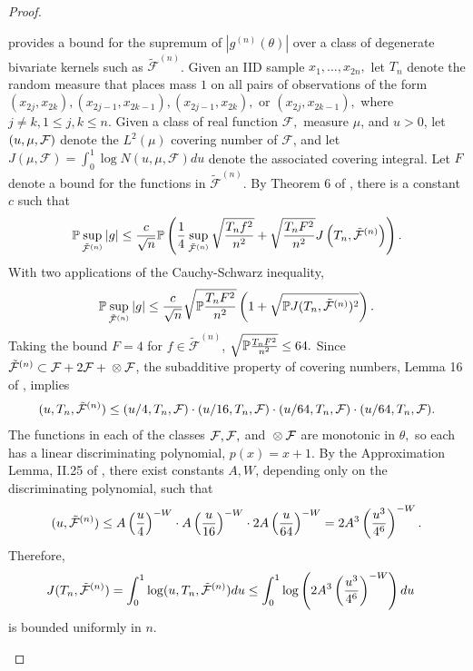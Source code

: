 \documentclass[12pt]{article}
\DeclareMathOperator{\N}{\mathcal{N}}
\let\N\relax
\newcommand{\N}{N}
\newcommand{\J}{J}
\let\n\relax
\newcommand{\n}[1]{{#1}^{(n)}}
\newcommand{\gn}{g^{(n)}}
\newcommand{\PP}{\mathbb{P}}
\newcommand{\FFn}{\tilde{\mathcal{F}}^{(n)}}
\let\P\relax
\newcommand{\P}{P}
\begin{document}
\begin{proof}
\begin{enumerate}[wide, labelwidth=!, labelindent=0pt]
\citet{nolan87,nolan88} provides a bound for the supremum of $|\gn(\theta)|$ over a class of degenerate bivariate kernels such as $\FFn$. 
Given an IID sample $x_1,\ldots,x_{2n},$ let $T_n$ denote the random measure that places mass $1$ on all pairs of observations of the form $(x_{2j},x_{2k}),(x_{2j-1},x_{2k-1}),(x_{2j-1},x_{2k}),$ or $(x_{2j},x_{2k-1}),$ where $j\neq k, 1\le j,k\le n$. Given a class of real function $\mathcal{F},$ measure $\mu$, and $u>0$, let $\N(u,\mu,\mathcal{F})$ denote the $L^2(\mu)$ covering number of $\mathcal{F}$, and let $\J(\mu,\mathcal{F})=\int_0^1\log N(u,\mu,\mathcal{F})du$ denote the associated covering integral. Let $F$ denote a bound for the functions in $\FFn$.
By Theorem 6 of \citet{nolan87}, there is a constant $c$ such that
\begin{align}
  \n{\PP}\sup_{\FFn} |\n{g}| \le \frac{c}{\sqrt n} \n{\PP}\left(\frac{1}{4}\sup_{\FFn}\sqrt{\frac{T_nf^2}{n^2}}
  +\sqrt{\frac{T_nF^2}{n^2}}\J\left(T_n,\FFn\right)\right).
\end{align}
With two applications of the Cauchy-Schwarz inequality,
\begin{align}
  \n{\PP}\sup_{\FFn} |\n{g}| \le \frac{c}{\sqrt{n}}\sqrt{\n{\PP}\frac{T_nF^2}{n^2}}
  \left(1 + \sqrt{\n{\PP}\J(T_n,\FFn)^2}\right).
\end{align}
Taking the bound $F=4$ for $f\in\FFn$,  $\sqrt{\n{\PP}\frac{T_nF^2}{n^2}}\le 64.$ Since $\FFn \subset \mathcal{F} + 2\n{\P}\mathcal{F}+\n{\P}\otimes\n{\P}\mathcal{F}$, the subadditive property of covering numbers, Lemma 16 of \citet{nolan87}, implies
\begin{align}
  \N(u,T_n,\FFn)\le \N(u/4,T_n,\mathcal{F})\cdot\N(u/16,T_n,\n{\P}\mathcal{F})\cdot\N(u/64,T_n,\n{\P}\mathcal{F})\cdot \N(u/64,T_n,\n{\P}\n{\P}\mathcal{F}).
\end{align}
The functions in each of the classes $\mathcal{F}, \n{\P}\mathcal{F},$ and $\n{\P}\otimes\n{\P}\mathcal{F}$ are monotonic in $\theta,$ so each has a linear discriminating polynomial, $p(x)=x+1.$ By the Approximation Lemma, II.25 of \citet{pollard84}, there exist constants $A,W$, depending only on the discriminating polynomial, such that
\begin{align}
\N(u,\FFn)\le A\left(\frac{u}{4}\right)^{-W}\cdot A\left(\frac{u}{16}\right)^{-W} \cdot 2A\left(\frac{u}{64}\right)^{-W} = 2A^3\left(\frac{u^3}{4^6}\right)^{-W}. 
\end{align}
Therefore,
\begin{align}
  \J(T_n,\FFn) &= \int_0^1\log\N(u,T_n,\FFn)du \le
                   \int_0^1\log\left(2A^3\left(\frac{u^3}{4^6}\right)^{-W}\right)du
\end{align}
is bounded uniformly in $n$.




\end{enumerate}
\end{proof}
\end{document}
